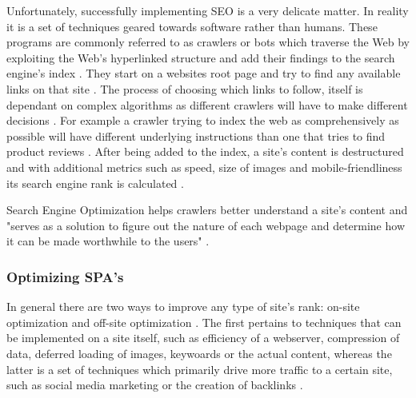 Unfortunately, successfully implementing SEO is a very delicate matter. In reality it is a set of techniques geared towards software rather than humans. These programs are commonly referred to as crawlers or bots which traverse the Web by exploiting the Web's hyperlinked structure and add their findings to the search engine's index \cite{Fink2014:inbook,menczer2001evaluating:proceedings}. They start on a websites root page and try to find any available links on that site \cite{Fink2014:inbook}. The process of choosing which links to follow, itself is dependant on complex algorithms as different crawlers will have to make different decisions \cite{menczer2001evaluating:proceedings}. For example a crawler trying to index the web as comprehensively as possible will have different underlying instructions than one that tries to find product reviews \cite{menczer2001evaluating:proceedings}. After being added to the index, a site's content is destructured and with additional metrics such as speed, size of images and mobile-friendliness its search engine rank is calculated \cite{Fink2014:inbook}.

Search Engine Optimization helps crawlers better understand a site's content and "serves as a solution to figure out the nature of each webpage and determine how it can be made worthwhile to the users" \cite{Khan2018:article}.

\subsubsection{Optimizing SPA's}
In general there are two ways to improve any type of site's rank: on-site optimization and off-site optimization \cite{Khan2018:article}. The first pertains to techniques that can be implemented on a site itself, such as efficiency of a webserver, compression of data, deferred loading of images, keywoards or the actual content, whereas the latter is a set of techniques which primarily drive more traffic to a certain site, such as social media marketing or the creation of backlinks \cite{Khan2018:article}. 